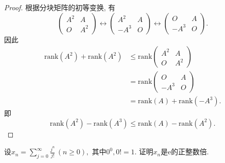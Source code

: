 \documentclass[a4paper,12pt]{ctexart}
\newcommand{\e}{\mathrm{e}}
\newcommand{\rank}{\mathrm{rank}}
\begin{document}
    \begin{proof}
        根据分块矩阵的初等变换, 有
        \begin{equation}
            \begin{pmatrix}
                A^2 & A\\
                O & A^2
            \end{pmatrix}
            \leftrightarrow
            \begin{pmatrix}
                A^2 & A\\
                -A^3 & O
            \end{pmatrix}
            \leftrightarrow
            \begin{pmatrix}
                O & A\\
                -A^3 & O
            \end{pmatrix}.
        \end{equation}
        因此
        \begin{equation}
            \begin{aligned}
                \rank(A^2) + \rank(A^2)
                &\leq\rank
                \begin{pmatrix}
                    A^2 & A\\
                    O & A^2
                \end{pmatrix}\\
                &=\rank
                \begin{pmatrix}
                    O & A\\
                    -A^3 & O
                \end{pmatrix}\\
                &=\rank(A) + \rank(-A^3).
            \end{aligned}
        \end{equation}
        即
        \begin{equation}
            \rank(A^2)-\rank(A^3)\leq\rank(A)-\rank(A^2).
        \end{equation}
    \end{proof}


    \begin{problem}
        设$\displaystyle x_n=\sum_{j=0}^{\infty}{\frac{j^n}{j!}}
        \,(n\geq 0),$
        其中$0^0, 0!=1$. 证明$x_n$是$\e$的正整数倍.
    \end{problem}
\end{document}
